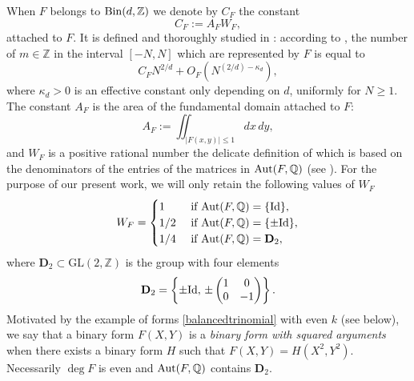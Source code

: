 \documentclass[10pt]{article}
\theoremstyle{definition}
\numberwithin{equation}{section}
\newcommand {\Q}{{\mathbb{Q}}}
\newcommand {\Z}{{\mathbb{Z}}}
\newcommand{\GL}{\mathrm {GL}}
\begin{document}
 When $F$ belongs to ${\rm Bin } (d, \Z)$ we denote by $C_F$ the constant 
 \begin{equation}\label{defCF} C_F:=A_FW_F,
 \end{equation}
 attached to $F$. It is defined and thoroughly studied in \cite[Theorem 1.2]{SX}: according to \cite[Theorem 1.1]{SX}, the number of $m\in\Z$ in the interval $[-N,N]$ which are represented by $F$ is equal to 
 \begin{equation}\label{Equation:CFN2/d}
 C_FN^{2/d}+O_F (N^{(2/d) -\kappa_d}),
 \end{equation}
 where $\kappa_d >0$ is an effective constant only depending on $d$, uniformly for $N \geqslant 1$. The constant $A_F$ is the area of the fundamental domain attached to $F$: 
 \begin{equation}\label{defAF}
 A_F:=\iint_{ 
 \vert F(x,y) \vert \leqslant 1} dx\, dy,\end{equation}
 and $W_F$ is a positive rational number the delicate definition of which is based on the denominators of the entries of the matrices in 
 ${\rm Aut}(F, \Q)$ (see \cite[Theorem 1.2]{SX}). For the purpose of our present work, we will only retain the following values of $W_F$ 
 \begin{equation}\label{valuesofWF}
 W_F=
 \begin{cases}
 1 & \text{ if } {\rm Aut}(F, \Q) =\{ {\rm Id}\}, \\
 1/2 & \text{ if } {\rm Aut}(F, \Q) = \{ \pm {\rm Id}\},\\
 1/4 & \text{ if } {\rm Aut}(F, \Q) = {\mathbf D}_2,
 \end{cases}
 \end{equation}
 where ${\mathbf D_2}\subset{\GL}(2, \Z)$ is the group with four elements
 \[
 {\mathbf D_2} =\left\{ \pm {\rm Id},\, \pm \begin{pmatrix}1 & 0\\ 0 & -1 \end{pmatrix}\right\}.
 \]
 Motivated by the example of forms \eqref{balancedtrinomial} with even $k$ (see below), we say that a binary form $F(X,Y)$ is a {\em binary form with squared arguments} when there exists a binary form $H$ such that $F(X,Y) =H(X^2, Y^2)$. Necessarily $\deg F $ is even and ${\rm Aut} (F, \Q)$ contains ${\mathbf D}_2$.
 
\end{document}
